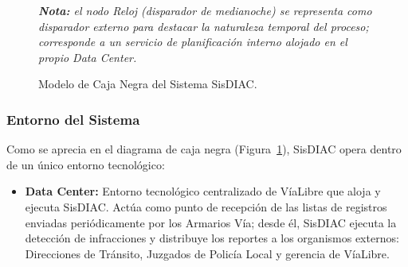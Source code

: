 \documentclass[12pt,letterpaper]{article}
\begin{document}
\begin{figure}[htb]
	\caption{Modelo de Caja Negra del Sistema SisDIAC.}
	\label{fig:cajaNegra}
	\vspace{0.4em}
	{\footnotesize\textit{\textbf{Nota:} el nodo Reloj (disparador de medianoche) se representa como disparador externo para destacar la naturaleza temporal del proceso; corresponde a un servicio de planificación interno alojado en el propio Data Center.}}
\end{figure}

\subsubsection{Entorno del Sistema}
Como se aprecia en el diagrama de caja negra (Figura~\ref{fig:cajaNegra}), SisDIAC opera dentro de un único entorno tecnológico:
\begin{itemize}
	\item \textbf{Data Center:} Entorno tecnológico centralizado de VíaLibre que aloja y ejecuta SisDIAC. Actúa como punto de recepción de las listas de registros enviadas periódicamente por los Armarios Vía; desde él, SisDIAC ejecuta la detección de infracciones y distribuye los reportes a los organismos externos: Direcciones de Tránsito, Juzgados de Policía Local y gerencia de VíaLibre.
\end{itemize}
\end{document}
